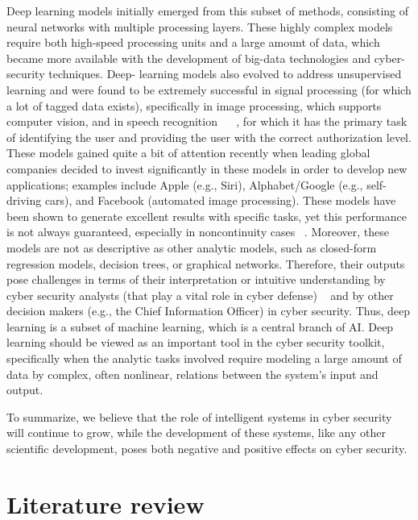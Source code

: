 Deep learning models initially emerged from this subset of methods, consisting of neural
networks with multiple processing layers. These highly complex models require both
high-speed processing units and a large amount of data, which became more available
with the development of big-data technologies and cyber-security techniques. Deep-
learning models also evolved to address unsupervised learning and were found to be
extremely successful in signal processing (for which a lot of tagged data exists), specifically in image processing, which supports computer vision, and in speech recognition
~\cite{HeZRS16} ~\cite{hinton2012deep}, for which it has the primary task of identifying the
user and providing the user with the correct authorization level. These models gained
quite a bit of attention recently when leading global companies decided to invest 
significantly in these models in order to develop new applications; examples include Apple
(e.g., Siri), Alphabet/Google (e.g., self-driving cars), and Facebook (automated image
processing). These models have been shown to generate excellent results with specific
tasks, yet this performance is not always guaranteed, especially in noncontinuity cases
~\cite{Schmidhuber15}. Moreover, these models are not as descriptive as other analytic
models, such as closed-form regression models, decision trees, or graphical networks.
Therefore, their outputs pose challenges in terms of their interpretation or intuitive
understanding by cyber security analysts (that play a vital role in cyber defense)
~\cite{GanesanJC17} and by other decision makers (e.g., the Chief Information Officer)
in cyber security. Thus, deep learning is a subset of machine learning, which is a central
branch of AI. Deep learning should be viewed as an important tool in the cyber security
toolkit, specifically when the analytic tasks involved require modeling a large amount
of data by complex, often nonlinear, relations between the system’s input and output.

      To summarize, we believe that the role of intelligent systems in cyber security will
continue to grow, while the development of these systems, like any other scientific
development, poses both negative and positive effects on cyber security.


\section{Literature review} 

